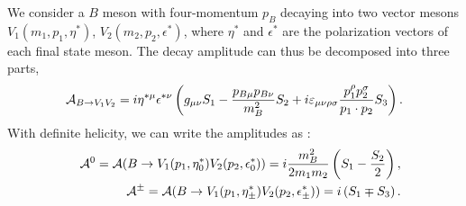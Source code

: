 \documentclass[11pt]{article}
\begin{document}

We consider a $B$ meson with four-momentum $p_B$ decaying into two vector mesons $ V_1(m_1, p_1, \eta^*)$, $ V_2(m_2,p_2,\epsilon^*)$, where $\eta^*$ and $\epsilon^*$ are the polarization vectors of each final state meson. The decay amplitude can thus be decomposed into three parts,
\begin{eqnarray}
{\cal A}_{B\to V_1V_2}=i\eta^{*\mu} \epsilon^{*\nu}\left(g_{\mu\nu}S_1-\frac{p_{B\mu}p_{B\nu}}{m_B^2}S_2+i\varepsilon_{\mu\nu\rho\sigma}\frac{p_1^\rho p_2^\sigma}{p_1\cdot p_2}S_3\right).
\end{eqnarray}
With definite helicity, we can write the amplitudes as :
\begin{eqnarray}
&&{\cal A}^0={\cal A}(B\to V_1( p_1, \eta_0^*)V_2( p_2, \epsilon^*_0))=i\frac{m_B^2}{2m_1m_2}\left(S_1-\frac{S_2}{2}\right),\\
&&{\cal A}^\pm={\cal A}(B\to V_1( p_1, \eta_\pm^*)V_2( p_2, \epsilon^*_\pm))=i\left(S_1\mp S_3\right).
\end{eqnarray}
\end{document}
